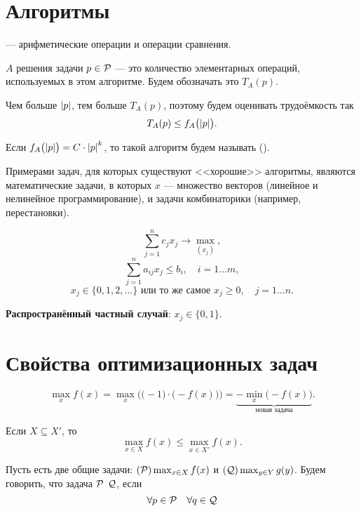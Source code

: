 \section{Алгоритмы}


 --- арифметические операции и операции сравнения.


 $A$ решения задачи $p \in \P$ --- это количество элементарных операций, используемых в этом алгоритме. Будем обозначать это $T_A(p)$.

\remark

Чем больше $\abs{p}$, тем больше $T_A(p)$, поэтому будем оценивать трудоёмкость так
\[
	T_A(p) \le f_A\big(\abs{p}\big).
\]


Если $f_A\big(\abs{p}\big) = C \cdot \abs{p}^k$, то такой алгоритм будем называть  ().

Примерами задач, для которых существуют <<хорошие>> алгоритмы, являются математические задачи, в которых $x$ --- множество векторов (линейное и нелинейное программирование), и задачи комбинаторики (например, перестановки).


\[\sum_{j=1}^{n} c_j x_j \to \max_{(x_j)},\]
\[\sum_{j=1}^{n}a_{ij} x_j \le b_i, \quad i = 1\dots m,\]
\[x_j \in \{0, 1, 2, \dots\} \text{ или то же самое } x_j \ge 0, \quad j = 1\dots n.\]

\textbf{Распространённый частный случай}: $x_j \in \{0, 1\}$.

\section{Свойства оптимизационных задач}

\fact

\[
	\max_x f(x) = \max_x \Big(\big(-1\big) \cdot \big(-f(x)\big)\Big) = \underbrace{-\min_x \big(-f(x)\big)}_{\text{новая задача}}.
\]


Если $X \subseteq X'$, то
\[
	\max_{x \in X} f(x) \le \max_{x \in X'} f(x).
\]


Пусть есть две общие задачи: $(\P) \max_{x \in X} f(x)$ и $(\Q) \max_{y \in Y} g(y)$. Будем говорить, что задача $\P$  $\Q$, если
\[
	\forall p \in \P \quad \forall q \in \Q
\]

